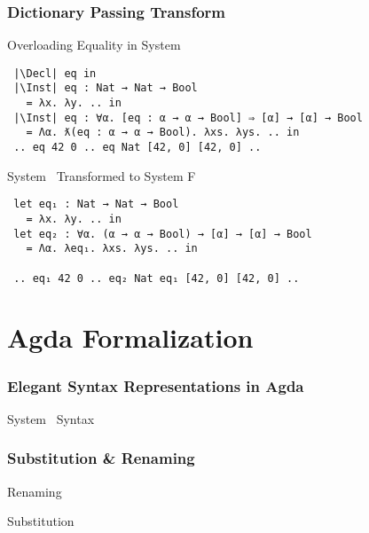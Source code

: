 \documentclass[aspectratio=169]{beamer}
\begin{document}
\begin{frame}[fragile]
  \frametitle{Dictionary Passing Transform}
  \begin{block}{Overloading Equality in System \Fo\ }
    \begin{center}
      \begin{verbatim}
 |\Decl| eq in
 |\Inst| eq : Nat → Nat → Bool 
   = λx. λy. .. in
 |\Inst| eq : ∀α. [eq : α → α → Bool] ⇒ [α] → [α] → Bool 
   = Λα. ƛ(eq : α → α → Bool). λxs. λys. .. in
 .. eq 42 0 .. eq Nat [42, 0] [42, 0] .. 
      \end{verbatim}
    \end{center}
  \end{block}
  \begin{block}{System \Fo\ Transformed to System F}
    \begin{center}
      \begin{verbatim}
 let eq₁ : Nat → Nat → Bool 
   = λx. λy. .. in
 let eq₂ : ∀α. (α → α → Bool) → [α] → [α] → Bool 
   = Λα. λeq₁. λxs. λys. .. in
  
 .. eq₁ 42 0 .. eq₂ Nat eq₁ [42, 0] [42, 0] .. 
      \end{verbatim}
    \end{center}
  \end{block}
\end{frame}

\section{Agda Formalization}

\begin{frame}[fragile]
  \frametitle{Elegant Syntax Representations in Agda}
  \begin{block}{System \Fo\ Syntax}
    \begin{small}
      \FoTerm
    \end{small}
  \end{block}
\end{frame}

\begin{frame}[fragile]
  \frametitle{Substitution \& Renaming}
  \begin{block}{Renaming}
    \begin{small}
      \begin{AgdaSuppressSpace}
        \FRen
        \phantom{}
        \Fwk
      \end{AgdaSuppressSpace}
    \end{small}
  \end{block}
  \begin{block}{Substitution}
    \begin{small}
      \begin{AgdaSuppressSpace}
        \FSub
        \phantom{}
        \Fsubs
      \end{AgdaSuppressSpace}
    \end{small}
  \end{block}
\end{frame}
\end{document}
